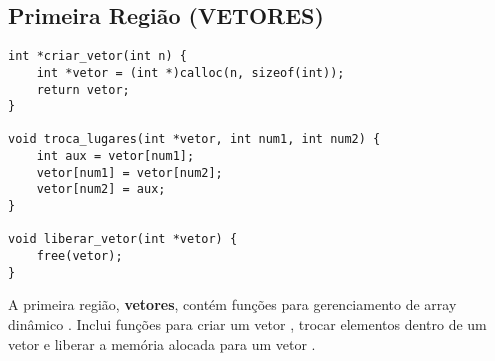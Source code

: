 \documentclass[12pt, openright, oneside, a4paper, chapter=TITLE, section=TITLE, subsection=TITLE, subsubsection=TITLE, brazil]{abntex2}
\newenvironment{codebox}%
  {\begin{mdframed}[backgroundcolor=gray!5, linecolor=gray, roundcorner=5pt]}%
  {\end{mdframed}}
\begin{document}
\subsection{Primeira Região (VETORES)}
\begin{codebox}
\begin{verbatim}
int *criar_vetor(int n) {
    int *vetor = (int *)calloc(n, sizeof(int));
    return vetor;
}

void troca_lugares(int *vetor, int num1, int num2) {
    int aux = vetor[num1];
    vetor[num1] = vetor[num2];
    vetor[num2] = aux;
}

void liberar_vetor(int *vetor) {
    free(vetor);
}
\end{verbatim}
\end{codebox}
\hspace{1.25cm}A primeira região, \textbf{vetores}, contém funções para gerenciamento de array dinâmico . Inclui funções para criar um vetor , trocar elementos dentro de um vetor  e liberar a memória alocada para um vetor .
\end{document}
